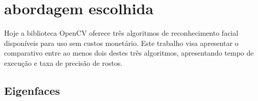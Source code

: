 

\section*{abordagem escolhida}

Hoje a biblioteca OpenCV oferece três algoritmos de reconhecimento facial disponíveis para uso sem custos monetário. Este trabalho visa apresentar o comparativo entre ao menos dois destes três algoritmos, apresentando tempo de execução e taxa de precisão de rostos.

\subsection*{Eigenfaces} %
\label{sub:eigenfaces}

